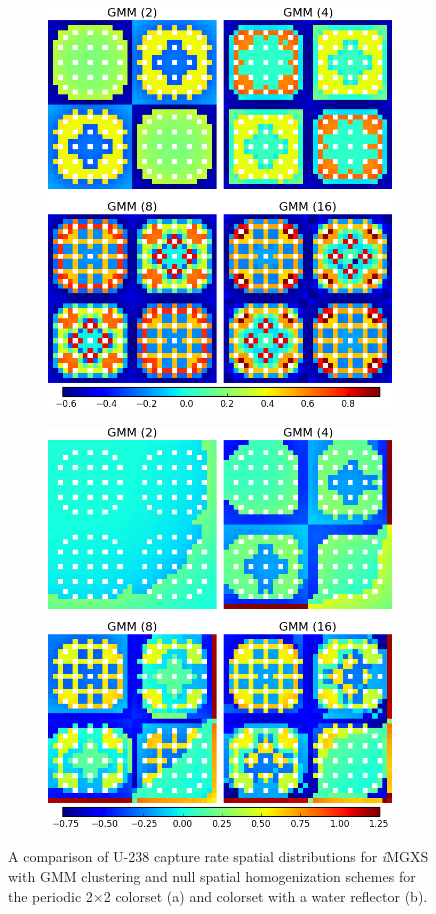 \documentclass[12pt,twoside]{mitthesis-exec}
\begin{document}
\begin{figure}[h!]
\centering
\begin{subfigure}{0.9\textwidth}
  \centering
\includegraphics[width=0.55\linewidth]{figures/results/compare/2x2/compare-capt}
  \caption{}
  \label{fig:refl-capt-rates-comp-refl}
\end{subfigure}
\par\bigskip
\begin{subfigure}{0.9\textwidth}
  \centering
\includegraphics[width=0.55\linewidth]{figures/results/compare/reflector/compare-capt}
  \caption{}
  \label{fig:refl-capt-rates-comp-2x2}
\end{subfigure}
\caption[U-238 capture rate comparison for the colorset]{A comparison of U-238 capture rate spatial distributions for \textit{i}MGXS with GMM clustering and null spatial homogenization schemes for the periodic 2$\times$2 colorset (a) and colorset with a water reflector (b).}
\label{fig:refl-capt-rates-comp}
\end{figure}
\end{document}
